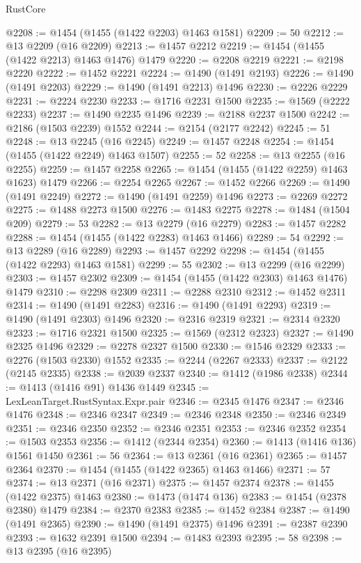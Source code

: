 \begin{lexlean}{RustCore}
\begin{coremodule}
@2208 := @1454 (@1455 (@1422 @2203) @1463 @1581)
@2209 := 50
@2212 := @13 @2209 (@16 @2209)
@2213 := @1457 @2212
@2219 := @1454 (@1455 (@1422 @2213) @1463 @1476) @1479
@2220 := @2208 @2219
@2221 := @2198 @2220
@2222 := @1452 @2221
@2224 := @1490 (@1491 @2193)
@2226 := @1490 (@1491 @2203)
@2229 := @1490 (@1491 @2213) @1496
@2230 := @2226 @2229
@2231 := @2224 @2230
@2233 := @1716 @2231 @1500
@2235 := @1569 (@2222 @2233)
@2237 := @1490 @2235 @1496
@2239 := @2188 @2237 @1500
@2242 := @2186 (@1503 @2239) @1552
@2244 := @2154 (@2177 @2242)
@2245 := 51
@2248 := @13 @2245 (@16 @2245)
@2249 := @1457 @2248
@2254 := @1454 (@1455 (@1422 @2249) @1463 @1507)
@2255 := 52
@2258 := @13 @2255 (@16 @2255)
@2259 := @1457 @2258
@2265 := @1454 (@1455 (@1422 @2259) @1463 @1623) @1479
@2266 := @2254 @2265
@2267 := @1452 @2266
@2269 := @1490 (@1491 @2249)
@2272 := @1490 (@1491 @2259) @1496
@2273 := @2269 @2272
@2275 := @1488 @2273 @1500
@2276 := @1483 @2275
@2278 := @1484 (@1504 @209)
@2279 := 53
@2282 := @13 @2279 (@16 @2279)
@2283 := @1457 @2282
@2288 := @1454 (@1455 (@1422 @2283) @1463 @1466)
@2289 := 54
@2292 := @13 @2289 (@16 @2289)
@2293 := @1457 @2292
@2298 := @1454 (@1455 (@1422 @2293) @1463 @1581)
@2299 := 55
@2302 := @13 @2299 (@16 @2299)
@2303 := @1457 @2302
@2309 := @1454 (@1455 (@1422 @2303) @1463 @1476) @1479
@2310 := @2298 @2309
@2311 := @2288 @2310
@2312 := @1452 @2311
@2314 := @1490 (@1491 @2283)
@2316 := @1490 (@1491 @2293)
@2319 := @1490 (@1491 @2303) @1496
@2320 := @2316 @2319
@2321 := @2314 @2320
@2323 := @1716 @2321 @1500
@2325 := @1569 (@2312 @2323)
@2327 := @1490 @2325 @1496
@2329 := @2278 @2327 @1500
@2330 := @1546 @2329
@2333 := @2276 (@1503 @2330) @1552
@2335 := @2244 (@2267 @2333)
@2337 := @2122 (@2145 @2335)
@2338 := @2039 @2337
@2340 := @1412 (@1986 @2338)
@2344 := @1413 (@1416 @91) @1436 @1449
@2345 := LexLeanTarget.RustSyntax.Expr.pair
@2346 := @2345 @1476
@2347 := @2346 @1476
@2348 := @2346 @2347
@2349 := @2346 @2348
@2350 := @2346 @2349
@2351 := @2346 @2350
@2352 := @2346 @2351
@2353 := @2346 @2352
@2354 := @1503 @2353
@2356 := @1412 (@2344 @2354)
@2360 := @1413 (@1416 @136) @1561 @1450
@2361 := 56
@2364 := @13 @2361 (@16 @2361)
@2365 := @1457 @2364
@2370 := @1454 (@1455 (@1422 @2365) @1463 @1466)
@2371 := 57
@2374 := @13 @2371 (@16 @2371)
@2375 := @1457 @2374
@2378 := @1455 (@1422 @2375) @1463
@2380 := @1473 (@1474 @136)
@2383 := @1454 (@2378 @2380) @1479
@2384 := @2370 @2383
@2385 := @1452 @2384
@2387 := @1490 (@1491 @2365)
@2390 := @1490 (@1491 @2375) @1496
@2391 := @2387 @2390
@2393 := @1632 @2391 @1500
@2394 := @1483 @2393
@2395 := 58
@2398 := @13 @2395 (@16 @2395)

\end{coremodule}
\end{lexlean}
